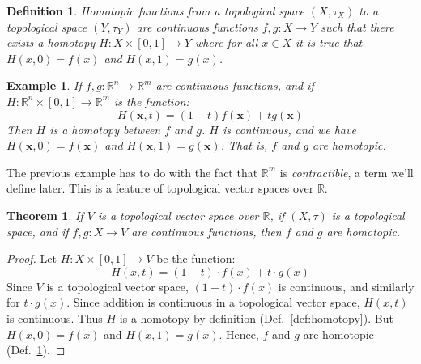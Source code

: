 \documentclass{article}
\theoremstyle{plain}
\newtheorem{theorem}{Theorem}[section]
\theoremstyle{normal}
\newtheorem{definition}{Definition}[section]
\newtheorem{example}{Example}[section]
\begin{document}
        \begin{definition}
            \label{def:homotopic}%
            Homotopic functions from a topological space $(X,\tau_{X})$ to a
            topological space $(Y,\tau_{Y})$ are continuous functions
            $f,g:X\rightarrow{Y}$ such that there exists a homotopy
            $H:X\times[0,1]\rightarrow{Y}$ where for all $x\in{X}$ it is
            true that $H(x,0)=f(x)$ and $H(x,1)=g(x)$.
        \end{definition}
        \begin{example}
            If $f,g:\mathbb{R}^{n}\rightarrow\mathbb{R}^{m}$ are continuous
            functions, and if
            $H:\mathbb{R}^{n}\times[0,1]\rightarrow\mathbb{R}^{m}$ is the
            function:
            \begin{equation}
                H(\mathbf{x},t)=(1-t)f(\mathbf{x})+tg(\mathbf{x})
            \end{equation}
            Then $H$ is a homotopy between $f$ and $g$. $H$ is continuous, and
            we have $H(\mathbf{x},0)=f(\mathbf{x})$ and
            $H(\mathbf{x},1)=g(\mathbf{x})$. That is, $f$ and $g$ are homotopic.
        \end{example}
        The previous example has to do with the fact that $\mathbb{R}^{m}$ is
        \textit{contractible}, a term we'll define later. This is a feature
        of topological vector spaces over $\mathbb{R}$.
        \begin{theorem}
            If $V$ is a topological vector space over $\mathbb{R}$, if
            $(X,\tau)$ is a topological space, and if
            $f,g:X\rightarrow{V}$ are continuous functions, then $f$ and $g$
            are homotopic.
        \end{theorem}
        \begin{proof}
            Let $H:X\times[0,1]\rightarrow{V}$ be the function:
            \begin{equation}
                H(x,t)=(1-t)\cdot{f}(x)+t\cdot{g}(x)
            \end{equation}
            Since $V$ is a topological vector space,
            $(1-t)\cdot{f}(x)$ is continuous, and similarly for $t\cdot{g}(x)$.
            Since addition is continuous in a topological vector space,
            $H(x,t)$ is continuous. Thus $H$ is a homotopy by definition
            (Def.~\ref{def:homotopy}). But $H(x,0)=f(x)$ and $H(x,1)=g(x)$.
            Hence, $f$ and $g$ are homotopic (Def.~\ref{def:homotopic}).
        \end{proof}
\end{document}
